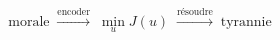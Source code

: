 \documentclass[preview]{standalone}
\begin{document}
\begin{align*}
\text{morale} \;\xrightarrow{\text{encoder}}\; \min_u J(u) \;\xrightarrow{\text{r\'esoudre}}\; \text{tyrannie}
\end{align*}
\end{document}

